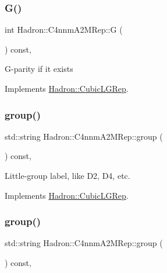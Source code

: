 \subsubsection{\texorpdfstring{G()}{G()}\hspace{0.1cm}{\footnotesize\ttfamily [2/2]}}
{\footnotesize\ttfamily int Hadron\+::\+C4nnm\+A2\+M\+Rep\+::G (\begin{DoxyParamCaption}{ }\end{DoxyParamCaption}) const\hspace{0.3cm}{\ttfamily [inline]}, {\ttfamily [virtual]}}

G-\/parity if it exists 

Implements \mbox{\hyperlink{structHadron_1_1CubicLGRep_ace26f7b2d55e3a668a14cb9026da5231}{Hadron\+::\+Cubic\+L\+G\+Rep}}.

\mbox{\label{structHadron_1_1C4nnmA2MRep_a469cdf0a49cdd54d88ab2786a8b25f13}} 
\subsubsection{\texorpdfstring{group()}{group()}\hspace{0.1cm}{\footnotesize\ttfamily [1/2]}}
{\footnotesize\ttfamily std\+::string Hadron\+::\+C4nnm\+A2\+M\+Rep\+::group (\begin{DoxyParamCaption}{ }\end{DoxyParamCaption}) const\hspace{0.3cm}{\ttfamily [inline]}, {\ttfamily [virtual]}}

Little-\/group label, like D2, D4, etc. 

Implements \mbox{\hyperlink{structHadron_1_1CubicLGRep_a9bdb14b519a611d21379ed96a3a9eb41}{Hadron\+::\+Cubic\+L\+G\+Rep}}.

\mbox{\label{structHadron_1_1C4nnmA2MRep_a469cdf0a49cdd54d88ab2786a8b25f13}} 
\subsubsection{\texorpdfstring{group()}{group()}\hspace{0.1cm}{\footnotesize\ttfamily [2/2]}}
{\footnotesize\ttfamily std\+::string Hadron\+::\+C4nnm\+A2\+M\+Rep\+::group (\begin{DoxyParamCaption}{ }\end{DoxyParamCaption}) const\hspace{0.3cm}{\ttfamily [inline]}, {\ttfamily [virtual]}}

